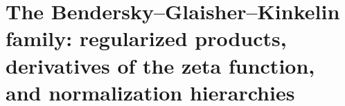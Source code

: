 \chapter{The Bendersky--Glaisher--Kinkelin family: regularized products, derivatives of the zeta function, and normalization hierarchies}
\label{chap:p3-final:43:bendersky_glaisher}

